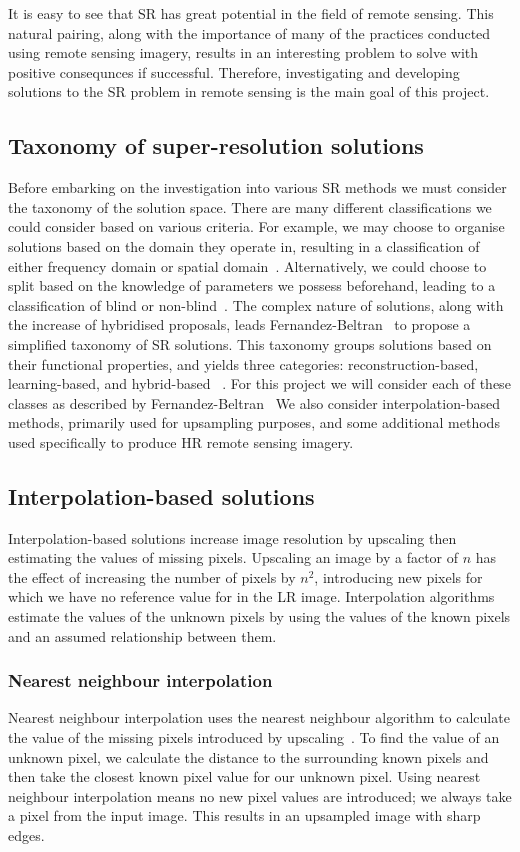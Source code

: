 It is easy to see that SR has great potential in the field of remote sensing. This natural pairing, along with the importance of many of the practices conducted using remote sensing imagery, results in an interesting problem to solve with positive consequnces if successful. Therefore, investigating and developing solutions to the SR problem in remote sensing is the main goal of this project.

\subsection{Taxonomy of super-resolution solutions}
Before embarking on the investigation into various SR methods we must consider the taxonomy of the solution space. There are many different classifications we could consider based on various criteria. For example, we may choose to organise solutions based on the domain they operate in, resulting in a classification of either frequency domain or spatial domain~\cite{superResRemoteSensingOverview}. Alternatively, we could choose to split based on the knowledge of parameters we possess beforehand, leading to a classification of blind or non-blind~\cite{superResRemoteSensingOverview}. The complex nature of solutions, along with the increase of hybridised proposals, leads Fernandez-Beltran \etal\ to propose a simplified taxonomy of SR solutions. This taxonomy groups solutions based on their functional properties, and yields three categories: reconstruction-based, learning-based, and hybrid-based ~\cite{superResRemoteSensingOverview}. For this project we will consider each of these classes as described by Fernandez-Beltran \etal\ We also consider interpolation-based methods, primarily used for upsampling purposes, and some additional methods used specifically to produce HR remote sensing imagery.

\subsection{Interpolation-based solutions}
Interpolation-based solutions increase image resolution by upscaling then estimating the values of missing pixels. Upscaling an image by a factor of $n$ has the effect of increasing the number of pixels by $n^2$, introducing new pixels for which we have no reference value for in the LR image. Interpolation algorithms estimate the values of the unknown pixels by using the values of the known pixels and an assumed relationship between them. 

\subsubsection{Nearest neighbour interpolation}
Nearest neighbour interpolation uses the nearest neighbour algorithm to calculate the value of the missing pixels introduced by upscaling~\cite{nnInterpolation}. To find the value of an unknown pixel, we calculate the distance to the surrounding known pixels and then take the closest known pixel value for our unknown pixel. Using nearest neighbour interpolation means no new pixel values are introduced; we always take a pixel from the input image. This results in an upsampled image with sharp edges.

